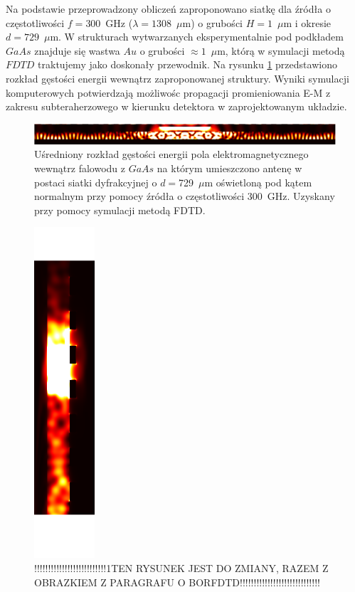 Na podstawie przeprowadzony obliczeń zaproponowano siatkę dla źródła o częstotliwości $f=300$~GHz ($\lambda=1308$~$\mu$m) o grubości $H=1$~$\mu$m i okresie $d=729$~$\mu$m. W strukturach wytwarzanych eksperymentalnie pod podkładem $GaAs$ znajduje się wastwa $Au$ o grubości $\approx1$~$\mu$m, którą w symulacji metodą $FDTD$ traktujemy jako doskonały przewodnik. Na rysunku \ref{fig:consrc_1d_f300Ghz} przedstawiono rozkład gęstości energii wewnątrz zaproponowanej struktury. Wyniki symulacji komputerowych potwierdzają  możliwośc propagacji promieniowania E-M z zakresu subteraherzowego w kierunku detektora w zaprojektowanym układzie.

\begin{figure}[tb]
	\includegraphics[width=\textwidth]{images/thz/consrc_siatka1d_300GHz_d729um.png}
	\caption{Uśredniony rozkład gęstości energii pola elektromagnetycznego wewnątrz falowodu z $GaAs$ na którym umieszczono antenę w postaci siatki dyfrakcyjnej o $d=$729~$\mu$m oświetloną pod kątem normalnym przy pomocy źródła o częstotliwości 300~GHz. Uzyskany przy pomocy symulacji metodą FDTD. }
	\label{fig:consrc_1d_f300Ghz}
\end{figure}

\begin{figure}
	\includegraphics[width=0.2\textwidth, angle=90]{images/antenaThz/ro_consrc_radial_antena.png}
	\caption{!!!!!!!!!!!!!!!!!!!!!!!!!!1TEN RYSUNEK JEST DO ZMIANY, RAZEM Z OBRAZKIEM Z PARAGRAFU O BORFDTD!!!!!!!!!!!!!!!!!!!!!!!!!!!!!}	
	\label{fig:concent_modfalo}

\end{figure}




